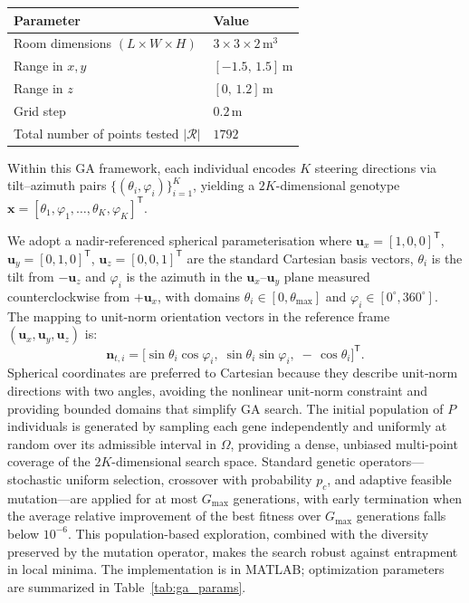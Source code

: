 \documentclass[journal]{IEEEtran}
\begin{document}
\begin{table}[tbh]
\begin{tabular}{|l|l|}
\textbf{Parameter} & \textbf{Value} \\ \hline
Room dimensions \((L\times W \times H)\) & \(3 \times 3 \times 2\,\mathrm{m^3}\) \\ \hline
Range in \(x,y\) & \([-1.5,\,1.5]\,\mathrm{m}\) \\ \hline
Range in \(z\) & \([0,\,1.2]\,\mathrm{m}\) \\ \hline
Grid step & \(0.2\,\mathrm{m}\) \\ \hline
Total number of points tested $|\mathcal{R}|$ & \(1792\) \\ \hline
\end{tabular}
\end{table}

Within this GA framework, each individual encodes \(K\) steering directions via tilt–azimuth pairs \(\{(\theta_i,\varphi_i)\}_{i=1}^{K}\), yielding a \(2K\)-dimensional genotype \(\mathbf x = [\theta_1,\varphi_1,\dots,\theta_K,\varphi_K]^{\mathsf T}\).

We adopt a nadir‐referenced spherical parameterisation where $\mathbf u_x=[1,0,0]^{\mathsf T}$, $\mathbf u_y=[0,1,0]^{\mathsf T}$, $\mathbf u_z=[0,0,1]^{\mathsf T}$ are the standard Cartesian basis vectors, \(\theta_i\) is the tilt from \(-\mathbf u_z\) and \(\varphi_i\) is the azimuth in the \(\mathbf u_x\)–\( \mathbf u_y\) plane measured counterclockwise from \(+\mathbf u_x\), with domains \(\theta_i\in[0,\theta_{\max}]\) and \(\varphi_i\in[0^\circ,360^\circ]\). The mapping to unit‐norm orientation vectors in the reference frame \((\mathbf u_x,\mathbf u_y,\mathbf u_z)\) is:
\begin{equation}
\mathbf n_{t,i}
= \bigl[\sin\theta_i\cos\varphi_i,\;\sin\theta_i\sin\varphi_i,\;-\,\cos\theta_i\bigr]^{\mathsf T}.
\end{equation}
Spherical coordinates are preferred to Cartesian because they describe unit‐norm directions with two angles, avoiding the nonlinear unit‐norm constraint and providing bounded domains that simplify GA search.
The initial population of $P$ individuals is generated by sampling each gene independently and uniformly at random over its admissible interval in $\Omega$, providing a dense, unbiased multi-point coverage of the $2K$-dimensional search space.
Standard genetic operators—stochastic uniform selection, crossover with probability \(p_c\), and adaptive feasible mutation—are applied for at most \(G_{\max}\) generations, 
with early termination when the average relative improvement of the best fitness over \(G_{\max}\) generations falls below \(10^{-6}\).
This population-based exploration, combined with the diversity preserved by the mutation operator, makes the search robust against entrapment in local minima.
The implementation is in MATLAB; optimization parameters are summarized in Table~\ref{tab:ga_params}.
\end{document}
